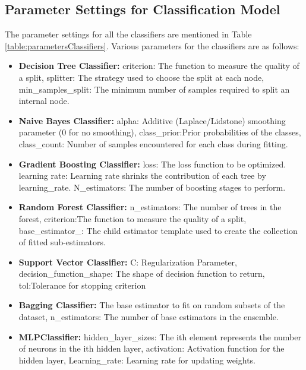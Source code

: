 \subsection{Parameter Settings for Classification Model}
\label{subsection:parameterSettings}
The parameter settings for all the classifiers are mentioned in Table \ref{table:parametersClassifiers}. Various parameters for the classifiers are as follows:

\renewcommand{\labelitemi}{\textbullet}
\begin{itemize}
    \item \textbf{Decision Tree Classifier:} criterion: The function to measure the quality of a split, splitter: The strategy used to choose the split at each node, min\_samples\_split: The minimum number of samples required to split an internal node.
    \item \textbf{Naive Bayes Classifier:} alpha: Additive (Laplace/Lidstone) smoothing parameter (0 for no smoothing), class\_prior:Prior probabilities of the classes, class\_count: Number of samples encountered for each class during fitting. 
    \item \textbf{Gradient Boosting Classifier:} loss: The loss function to be optimized. learning rate: Learning rate shrinks the contribution of each tree by learning\_rate. N\_estimators: The number of boosting stages to perform.
    \item \textbf{Random Forest Classifier:} n\_estimators: The number of trees in the forest, criterion:The function to measure the quality of a split, base\_estimator\_: The child estimator template used to create the collection of fitted sub-estimators.
    \item \textbf{Support Vector Classifier:} C: Regularization Parameter, decision\_function\_shape: The shape of decision function to return,  tol:Tolerance for stopping criterion
    \item \textbf{Bagging Classifier:} The base estimator to fit on random subsets of the dataset, n\_estimators: The number of base estimators in the ensemble.
    \item \textbf{MLPClassifier:} hidden\_layer\_sizes: The ith element represents the number of neurons in the ith hidden layer, activation: Activation function for the hidden layer,  Learning\_rate: Learning rate for updating weights.
\end{itemize}

